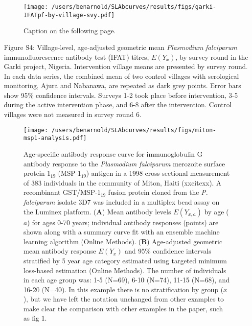 \documentclass[11pt]{article}
\begin{document}
\clearpage
\begin{figure}[htbp]
\begin{center}
\texttt{[image: /users/benarnold/SLAbcurves/results/figs/garki-IFATpf-by-village-svy.pdf]}
\begin{minipage}{\textwidth}
\caption{Caption on the following page.}
\label{fig:garkiVillageEy}
\end{minipage}
\end{center}
\end{figure}
\clearpage
Figure S4: Village-level, age-adjusted geometric mean \textit{Plasmodium falciparum} immunofluorescence antibody test (IFAT)  titres, $E(Y_x)$, by survey round in the Garki project, Nigeria. Intervention village means are presented by survey round. In each data series, the combined mean of two control villages with serological monitoring, Ajura and Nabanawa, are repeated  as dark grey points. Error bars show 95\% confidence intervals.  Surveys 1-2 took place before intervention, 3-5 during the active intervention phase, and 6-8 after the intervention.  Control villages were not measured in survey round 6.



\clearpage
\begin{figure}[htbp]
\begin{center}
\texttt{[image: /users/benarnold/SLAbcurves/results/figs/miton-msp1-analysis.pdf]}
\begin{minipage}{\textwidth}
\caption{Age-specific antibody response curve for immunoglobulin G antibody response to the \textit{Plasmodium falciparum} merozoite surface protein-$1_{19}$ (MSP-$1_{19}$) antigen in a 1998 cross-sectional measurement of 383 individuals in the community of Miton, Haiti (xxcitexx). A recombinant GST/MSP-$1_{19}$ fusion protein cloned from the \textit{P. falciparum} isolate 3D7 was included in a multiplex bead assay on the Luminex platform. (\textbf{A}) Mean antibody levels $E(Y_{x,a})$ by age ($a$) for ages 0-70 years; individual antibody responses (points) are shown along with a summary curve fit with an ensemble machine learning algorithm (Online Methods). (\textbf{B}) Age-adjusted geometric mean antibody response $E(Y_{x})$ and 95\% confidence intervals stratified by 5 year age category estimated using targeted minimum loss-based estimation (Online Methods). The number of individuals in each age group was: 1-5 (N=69), 6-10 (N=74), 11-15 (N=68), and 16-20 (N=40). In this example there is no stratification by group ($x$), but we have left the notation unchanged from other examples to make clear the comparison with other examples in the paper, such as fig 1.}
\label{fig:mitonEYxa}
\end{minipage}
\end{center}
\end{figure}
\end{document}
